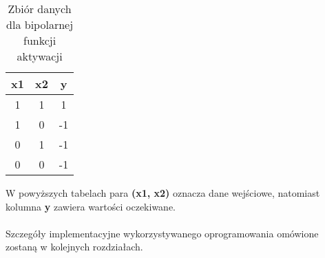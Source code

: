 \documentclass[../main.tex]{subfiles}
\begin{document}
        \begin{table}[h]
    \centering
    \begin{tabular}{|| c | c | c ||}
    \hline
    x1 & x2 & y \\ \hline
    1  & 1  & 1 \\
    1  & 0  & -1 \\
    0  & 1  & -1 \\
    0  & 0  & -1 \\ \hline
    \end{tabular}
    \caption{Zbiór danych dla bipolarnej funkcji aktywacji}
    \label{dataset_unipolar:1}
    \end{table}
    
    W powyższych tabelach para \textbf{(x1, x2)} oznacza dane wejściowe, natomiast kolumna \textbf{y} zawiera wartości oczekiwane.
    
    \paragraph{}
    Szczegóły implementacyjne wykorzystywanego oprogramowania omówione zostaną w kolejnych rozdziałach.
\end{document}
